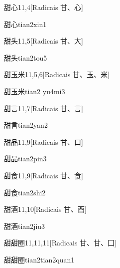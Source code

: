 \begin{entry}{甜心}{11,4}[Radicais ⽢、⼼]
  \begin{phonetics}{甜心}{tian2xin1}
  \end{phonetics}
\end{entry}

\begin{entry}{甜头}{11,5}[Radicais ⽢、⼤]
  \begin{phonetics}{甜头}{tian2tou5}
  \end{phonetics}
\end{entry}

\begin{entry}{甜玉米}{11,5,6}[Radicais ⽢、⽟、⽶]
  \begin{phonetics}{甜玉米}{tian2 yu4mi3}
  \end{phonetics}
\end{entry}

\begin{entry}{甜言}{11,7}[Radicais ⽢、⾔]
  \begin{phonetics}{甜言}{tian2yan2}
  \end{phonetics}
\end{entry}

\begin{entry}{甜品}{11,9}[Radicais ⽢、⼝]
  \begin{phonetics}{甜品}{tian2pin3}
  \end{phonetics}
\end{entry}

\begin{entry}{甜食}{11,9}[Radicais ⽢、⾷]
  \begin{phonetics}{甜食}{tian2shi2}
  \end{phonetics}
\end{entry}

\begin{entry}{甜酒}{11,10}[Radicais ⽢、⾣]
  \begin{phonetics}{甜酒}{tian2jiu3}
  \end{phonetics}
\end{entry}

\begin{entry}{甜甜圈}{11,11,11}[Radicais ⽢、⽢、⼞]
  \begin{phonetics}{甜甜圈}{tian2tian2quan1}
  \end{phonetics}
\end{entry}

